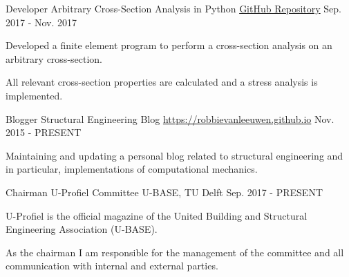 

\begin{cventries}

  \cventry
    {Developer} %
    {Arbitrary Cross-Section Analysis in Python} %
    {\href{https://github.com/robbievanleeuwen/section-properties}{GitHub Repository}} %
    {Sep. 2017 - Nov. 2017} %
    {
      \begin{cvitems} %
        \item {Developed a finite element program to perform a cross-section analysis on an arbitrary cross-section.}
        \item {All relevant cross-section properties are calculated and a stress analysis is implemented.}
      \end{cvitems}
    }
 
  \cventry
    {Blogger} %
    {Structural Engineering Blog} %
    {\href{https://robbievanleeuwen.github.io}{https://robbievanleeuwen.github.io}} %
    {Nov. 2015 - PRESENT} %
    {
      \begin{cvitems} %
        \item {Maintaining and updating a personal blog related to structural engineering and in particular, implementations of computational mechanics.}
      \end{cvitems}
    }
    
     \cventry
    {Chairman} %
    {U-Profiel Committee} %
    {U-BASE, TU Delft} %
    {Sep. 2017 - PRESENT} %
    {
      \begin{cvitems} %
        \item {U-Profiel is the official magazine of the United Building and Structural Engineering Association (U-BASE).}
        \item {As the chairman I am responsible for the management of the committee and all communication with internal and external parties.}
      \end{cvitems}
    }

\end{cventries}
